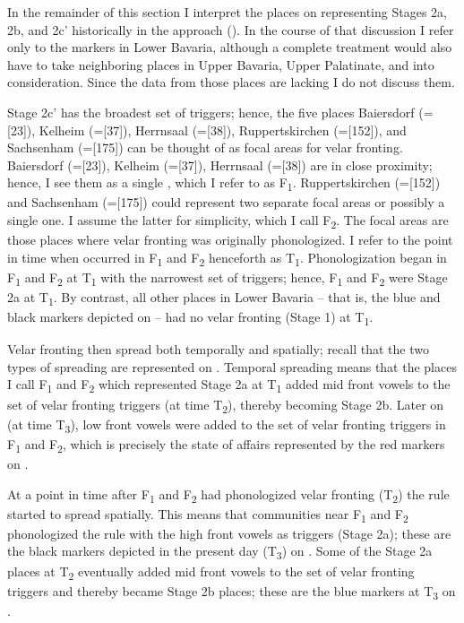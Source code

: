 In the remainder of this section I interpret the places on  representing Stages 2a, 2b, and 2c{}' historically in the  approach (). In the course of that discussion I refer only to the markers in Lower Bavaria, although a complete treatment would also have to take neighboring places in Upper Bavaria, Upper Palatinate, and  into consideration. Since the data from those places are lacking I do not discuss them.

Stage 2c' has the broadest set of triggers; hence, the five places Baiersdorf (=[23]), Kelheim (=[37]), Herrnsaal (=[38]), Ruppertskirchen (=[152]), and Sachsenham (=[175]) can be thought of as focal areas for velar fronting. Baiersdorf (=[23]), Kelheim (=[37]), Herrnsaal (=[38]) are in close proximity; hence, I see them as a single , which I refer to as F\textsubscript{1}. Ruppertskirchen (=[152]) and Sachsenham (=[175]) could represent two separate focal areas or possibly a single one. I assume the latter for simplicity, which I call F\textsubscript{2}. The focal areas are those places where velar fronting was originally phonologized. I refer to the point in time when  occurred in F\textsubscript{1} and F\textsubscript{2} henceforth as T\textsubscript{1}. Phonologization began in F\textsubscript{1} and F\textsubscript{2} at T\textsubscript{1} with the narrowest set of triggers; hence, F\textsubscript{1} and F\textsubscript{2} were Stage 2a at T\textsubscript{1}. By contrast, all other places in Lower Bavaria -- that is, the blue and black markers depicted on  -- had no velar fronting (Stage 1) at T\textsubscript{1}.

Velar fronting then spread both temporally and spatially; recall that the two types of spreading are represented on . Temporal spreading means that the places I call F\textsubscript{1} and F\textsubscript{2} which represented Stage 2a at T\textsubscript{1} added mid front vowels to the set of velar fronting triggers (at time T\textsubscript{2}), thereby becoming Stage 2b. Later on (at time T\textsubscript{3}), low front vowels were added to the set of velar fronting triggers in F\textsubscript{1} and F\textsubscript{2}, which is precisely the state of affairs represented by the red markers on .

At a point in time after F\textsubscript{1} and F\textsubscript{2} had phonologized velar fronting (T\textsubscript{2}) the rule started to spread spatially. This means that communities near F\textsubscript{1} and F\textsubscript{2} phonologized the rule with the high front vowels as triggers (Stage 2a); these are the black markers depicted in the present day (T\textsubscript{3}) on . Some of the Stage 2a places at T\textsubscript{2} eventually added mid front vowels to the set of velar fronting triggers and thereby became Stage 2b places; these are the blue markers at T\textsubscript{3} on .

